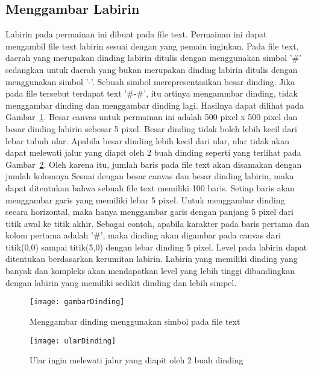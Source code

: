 \subsection{Menggambar Labirin}
Labirin pada permainan ini dibuat pada file text. Permainan ini dapat mengambil file text labirin sesuai dengan yang pemain inginkan. Pada file text, daerah yang merupakan dinding labirin ditulis dengan menggunakan simbol '\#' sedangkan untuk daerah yang bukan merupakan dinding labirin ditulis dengan menggunakan simbol '-'. Sebuah simbol merepresentasikan besar dinding. Jika pada file tersebut terdapat text '\#-\#', itu artinya mengammbar dinding, tidak menggambar dinding dan menggambar dinding lagi. Hasilnya dapat dilihat pada Gambar~\ref{fig:gambarDinding}. Besar canvas untuk permainan ini adalah 500 pixel x 500 pixel dan besar dinding labirin sebesar 5 pixel. Besar dinding tidak boleh lebih kecil dari lebar tubuh ular. Apabila besar dinding lebih kecil dari ular, ular tidak akan dapat melewati jalur yang diapit oleh 2 buah dinding seperti yang terlihat pada Gambar~\ref{fig:ularDinding}. Oleh karena itu, jumlah baris pada file text akan disamakan dengan jumlah kolomnya Sesuai dengan besar canvas dan besar dinding labirin, maka dapat ditentukan bahwa sebuah file text memiliki 100 baris. Setiap baris akan menggambar garis yang memiliki lebar 5 pixel. Untuk menggambar dinding secara horizontal, maka hanya menggambar garis dengan panjang 5 pixel dari titik awal ke titik akhir. Sebagai contoh, apabila karakter pada baris pertama dan kolom pertama adalah '\#', maka dinding akan digambar pada canvas dari titik(0,0) sampai titik(5,0) dengan lebar dinding 5 pixel. Level pada labirin dapat ditentukan berdasarkan kerumitan labirin. Labirin yang memiliki dinding yang banyak dan kompleks akan mendapatkan level yang lebih tinggi dibandingkan dengan labirin yang memiliki sedikit dinding dan lebih simpel. 

\begin{figure}[H]
	\centering  
	\texttt{[image: gambarDinding]}  
	\caption[Menggambar dinding menggunakan simbol pada file text]{Menggambar dinding menggunakan simbol pada file text}
	\label{fig:gambarDinding} 
\end{figure}

\begin{figure}[H]
	\centering  
	\texttt{[image: ularDinding]}  
	\caption[Ular ingin melewati jalur yang diapit oleh 2 buah dinding]{Ular ingin melewati jalur yang diapit oleh 2 buah dinding}
	\label{fig:ularDinding} 
\end{figure}


